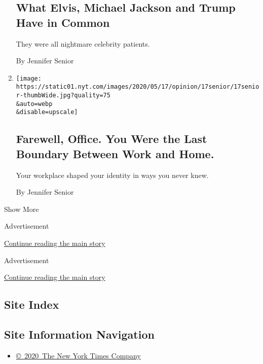 \begin{enumerate}
  \hypertarget{what-elvis-michael-jackson-and-trump-have-in-common}{%
  \subsection{What Elvis, Michael Jackson and Trump Have in
  Common}\label{what-elvis-michael-jackson-and-trump-have-in-common}}

  They were all nightmare celebrity patients.

  By Jennifer Senior
\item
  \href{/2020/05/17/opinion/coronavirus-office-telecommuting.html}{}

  \texttt{[image: https://static01.nyt.com/images/2020/05/17/opinion/17senior/17senior-thumbWide.jpg?quality=75\\\&auto=webp\\\&disable=upscale]}

  \hypertarget{farewell-office-you-were-the-last-boundary-between-work-and-home}{%
  \subsection{Farewell, Office. You Were the Last Boundary Between Work
  and
  Home.}\label{farewell-office-you-were-the-last-boundary-between-work-and-home}}

  Your workplace shaped your identity in ways you never knew.

  By Jennifer Senior
\end{enumerate}

Show More

Advertisement

\protect\hyperlink{after-mid1}{Continue reading the main story}

Advertisement

\protect\hyperlink{after-mktg}{Continue reading the main story}

\hypertarget{site-index}{%
\subsection{Site Index}\label{site-index}}

\hypertarget{site-information-navigation}{%
\subsection{Site Information
Navigation}\label{site-information-navigation}}

\begin{itemize}
\tightlist
\item
  \href{https://help.nytimes.com/hc/en-us/articles/115014792127-Copyright-notice}{©~2020~The
  New York Times Company}
\end{itemize}

